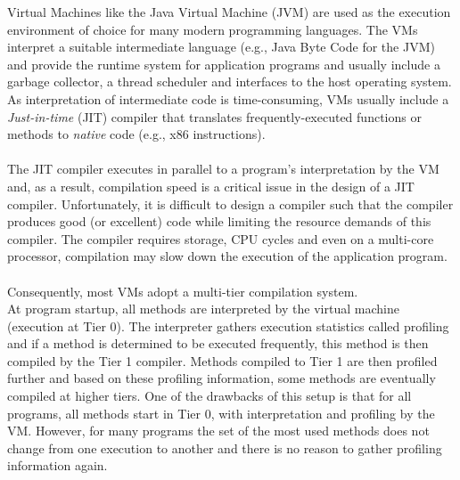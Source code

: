 Virtual Machines like the Java Virtual Machine (JVM) are used as the execution environment of choice for many modern programming languages. 
The VMs interpret a suitable intermediate language (e.g., Java Byte Code for the JVM) and provide the runtime system for application programs and usually include a garbage collector, a thread scheduler and interfaces to the host operating system. 
As interpretation of intermediate code is time-consuming, VMs usually include a \textit{Just-in-time} (JIT) compiler that translates frequently-executed functions or methods to \textit{native} code (e.g., x86 instructions).
\\\\
The JIT compiler executes in parallel to a program's interpretation by the VM and, as a result, compilation speed is a critical issue in the design of a JIT compiler.
Unfortunately, it is difficult to design a compiler such that the compiler produces good (or excellent) code while limiting the resource demands of this compiler. The compiler requires storage, CPU cycles and even on a multi-core processor, compilation may slow down the execution of the application program.
\\\\
Consequently, most VMs adopt a multi-tier compilation system.\\
At program startup, all methods are interpreted by the virtual machine (execution at Tier 0). The interpreter gathers execution statistics called profiling and if a method is determined to be executed frequently, this method is then compiled by the Tier 1 compiler. Methods compiled to Tier 1 are then profiled further and based on these profiling information, some methods are eventually compiled at higher tiers.
One of the drawbacks of this setup is that for all programs, all methods start in Tier 0, with interpretation and profiling by the VM. However, for many programs the set of the most used methods does not change from one execution to another and there is no reason to gather profiling information again. 
